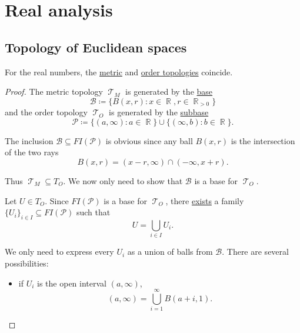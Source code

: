 \section{Real analysis}\label{sec:real_analysis}
\subsection{Topology of Euclidean spaces}\label{subsec:real_vector_space_geometry}

\begin{theorem}\label{thm:real_metric_and_order_topologies_coincide}
  For the real numbers, the \hyperref[def:metric_topology]{metric} and \hyperref[def:order_topology]{order topologies} coincide.
\end{theorem}
\begin{proof}
  The metric topology \( \mscrT_M \) is generated by the \hyperref[def:topological_base]{base}
  \begin{equation*}
    \mathcal{B} \coloneqq \{ B(x, r) \colon x \in \BbbR, r \in \BbbR_{>0} \}
  \end{equation*}
  and the order topology \( \mscrT_O \) is generated by the \hyperref[def:topological_subbase]{subbase}
  \begin{equation*}
    \mathcal{P} \coloneqq \{ (a, \infty) \colon a \in \BbbR \} \cup \{ (\infty, b) \colon b \in \BbbR \}.
  \end{equation*}

  The inclusion \( \mathcal{B} \subseteq FI(\mathcal{P}) \) is obvious since any ball \( B(x, r) \) is the intersection of the two rays
  \begin{equation*}
    B(x, r) = (x - r, \infty) \cap (-\infty, x + r).
  \end{equation*}

  Thus \( \mscrT_M \subseteq T_O \). We now only need to show that \( \mathcal{B} \) is a base for \( \mscrT_O \).

  Let \( U \in T_O \). Since \( FI(\mathcal{P}) \) is a base for \( \mscrT_O \), there \hyperref[def:topological_base/union]{exists} a family \( \{ U_i \}_{i \in I} \subseteq FI(\mathcal{P}) \) such that
  \begin{equation*}
    U = \bigcup_{i \in I} U_i.
  \end{equation*}

  We only need to express every \( U_i \) as a union of balls from \( \mathcal{B} \). There are several possibilities:
  \begin{itemize}
    \item if \( U_i \) is the open interval \( (a, \infty) \),
          \begin{equation*}
            (a, \infty) = \bigcup_{i=1}^\infty B(a + i, 1).
          \end{equation*}


\end{itemize}
\end{proof}
